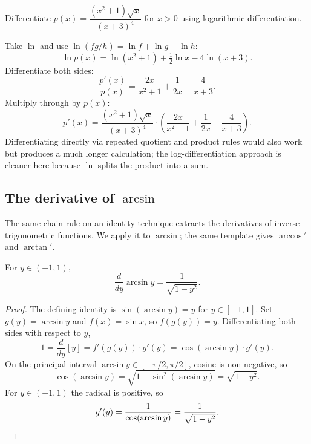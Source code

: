 \begin{workedexample}
\begin{example}
Differentiate \(p(x) = \dfrac{(x^{2} + 1) \sqrt{x}}{(x + 3)^{4}}\) for \(x > 0\) using logarithmic differentiation.
\end{example}

\begin{solution}
Take \(\ln\) and use \(\ln(fg/h) = \ln f + \ln g - \ln h\):
\[
\ln p(x) = \ln(x^{2} + 1) + \tfrac{1}{2} \ln x - 4 \ln(x + 3).
\]
Differentiate both sides:
\[
\frac{p'(x)}{p(x)} = \frac{2x}{x^{2} + 1} + \frac{1}{2x} - \frac{4}{x + 3}.
\]
Multiply through by \(p(x)\):
\[
p'(x) = \frac{(x^{2} + 1) \sqrt{x}}{(x + 3)^{4}} \cdot \left(\frac{2x}{x^{2} + 1} + \frac{1}{2x} - \frac{4}{x + 3}\right).
\]
Differentiating directly via repeated quotient and product rules would also work but produces a much longer calculation; the log-differentiation approach is cleaner here because \(\ln\) splits the product into a sum.
\end{solution}
\end{workedexample}

\subsection{The derivative of \texorpdfstring{$\arcsin$}{arcsin}}

The same chain-rule-on-an-identity technique extracts the derivatives of inverse trigonometric functions. We apply it to \(\arcsin\); the same template gives \(\arccos'\) and \(\arctan'\).

\begin{theorem}\label{thm:derivative-arcsin}
For \(y \in (-1, 1)\),
\[
\frac{d}{dy} \arcsin y = \frac{1}{\sqrt{1 - y^{2}}}.
\]
\end{theorem}

\begin{proof}
The defining identity is \(\sin(\arcsin y) = y\) for \(y \in [-1, 1]\). Set \(g(y) = \arcsin y\) and \(f(x) = \sin x\), so \(f(g(y)) = y\). Differentiating both sides with respect to \(y\),
\[
1 = \frac{d}{dy}[y] = f'(g(y)) \cdot g'(y) = \cos(\arcsin y) \cdot g'(y).
\]
On the principal interval \(\arcsin y \in [-\pi/2, \pi/2]\), cosine is non-negative, so
\[
\cos(\arcsin y) = \sqrt{1 - \sin^{2}(\arcsin y)} = \sqrt{1 - y^{2}}.
\]
For \(y \in (-1, 1)\) the radical is positive, so
\[
g'(y) = \frac{1}{\cos(\arcsin y)} = \frac{1}{\sqrt{1 - y^{2}}}. \qedhere
\]
\end{proof}

